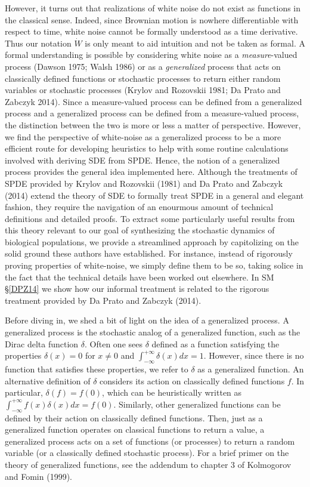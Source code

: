 \documentclass[]{article}
\begin{document}
However, it turns out that realizations of white noise do not exist as
functions in the classical sense. Indeed, since Brownian motion is
nowhere differentiable with respect to time, white noise cannot be
formally understood as a time derivative. Thus our notation \(\dot W\)
is only meant to aid intuition and not be taken as formal. A formal
understanding is possible by considering white noise as a
\emph{measure}-valued process (Dawson 1975; Walsh 1986) or as a
\emph{generalized} process that acts on classically defined functions or
stochastic processes to return either random variables or stochastic
processes (Krylov and Rozovskii 1981; Da Prato and Zabczyk 2014). Since
a measure-valued process can be defined from a generalized process and a
generalized process can be defined from a measure-valued process, the
distinction between the two is more or less a matter of perspective.
However, we find the perspective of white-noise as a generalized process
to be a more efficient route for developing heuristics to help with some
routine calculations involved with deriving SDE from SPDE. Hence, the
notion of a generalized process provides the general idea implemented
here. Although the treatments of SPDE provided by Krylov and Rozovskii
(1981) and Da Prato and Zabczyk (2014) extend the theory of SDE to
formally treat SPDE in a general and elegant fashion, they require the
navigation of an enourmous amount of technical definitions and detailed
proofs. To extract some particularly useful results from this theory
relevant to our goal of synthesizing the stochastic dynamics of
biological populations, we provide a streamlined approach by
capitolizing on the solid ground these authors have established. For
instance, instead of rigorously proving properties of white-noise, we
simply define them to be so, taking solice in the fact that the
technical details have been worked out elsewhere. In SM \S\ref{DPZ14} we
show how our informal treatment is related to the rigorous treatment
provided by Da Prato and Zabczyk (2014).

Before diving in, we shed a bit of light on the idea of a generalized
process. A generalized process is the stochastic analog of a generalized
function, such as the Dirac delta function \(\delta\). Often one sees
\(\delta\) defined as a function satisfying the properties
\(\delta(x)=0\) for \(x\neq0\) and
\(\int_{-\infty}^{+\infty}\delta(x)dx=1\). However, since there is no
function that satisfies these properties, we refer to \(\delta\) as a
generalized function. An alternative definition of \(\delta\) considers
its action on classically defined functions \(f\). In particular,
\(\delta(f)=f(0)\), which can be heuristically written as
\(\int_{-\infty}^{+\infty}f(x)\delta(x)dx=f(0)\). Similarly, other
generalized functions can be defined by their action on classically
defined functions. Then, just as a generalized function operates on
classical functions to return a value, a generalized process acts on a
set of functions (or processes) to return a random variable (or a
classically defined stochastic process). For a brief primer on the
theory of generalized functions, see the addendum to chapter 3 of
Kolmogorov and Fomin (1999).
\end{document}
